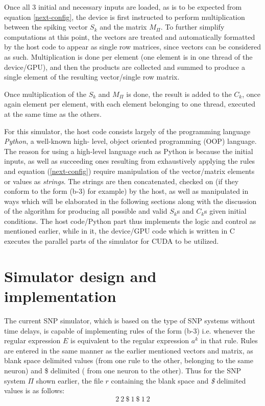 \documentclass{svmultm}
\begin{document}
Once all 3 initial and necessary inputs are loaded, as is to be
expected from equation \ref{next-config}, the device is first instructed to
perform multiplication between the spiking vector $S_k$ and the
matrix $M_{\Pi}$. To further simplify computations at this point, the
vectors are treated and automatically formatted by the host
code to appear as single row matrices, since vectors can be
considered as such. Multiplication is done per element (one
element is in one thread of the device/GPU{}), and then the
products are collected and summed to produce a single
element of the resulting vector/single row matrix.

Once multiplication of the $S_k$ and $M_{\Pi}$ is done,
the result is added to the $C_k$, once
again element per element, with each element belonging to
one thread, executed at the same time as the others.

For this simulator, the host code consists largely of
the programming language \textit{Python}, a well-known high-
level, object oriented programming (OOP) language. The
reason for using a high-level language such as Python is
because the initial inputs, as well as succeeding ones
resulting from exhaustively applying the rules and equation
(\ref{next-config}) require manipulation of the vector/matrix elements or
values as \textit{strings}. The strings are then concatenated, checked on (if they
conform to the form (b-3) for example) by the host, as well
as manipulated in ways which will be elaborated in the
following sections along with the discussion of the
algorithm for producing all possible and valid $S_k$s and $C_k$s given initial conditions. The host code/Python part thus implements the logic and control as mentioned earlier, while in it, the device/GPU code which is written in C executes the parallel parts of the simulator for CUDA to be utilized.


\section{Simulator design and implementation}\label{sect-snp-algo}

The current SNP simulator, which is based on the type of
SNP systems without time delays, is capable of
implementing rules of the form (b-3) i.e. whenever the
regular expression $E$ is equivalent to the regular expression $a^k$ in that rule. Rules are entered in the same manner
as the earlier mentioned vectors and matrix, as blank space
delimited values (from one rule to the other, belonging to the same neuron) and \$ delimited ( from one neuron to the
other). Thus for the SNP system ${\Pi}$ shown earlier, the file $r$
containing the blank space and \textit{\$} delimited values is as
follows:
\begin{equation}\label{rules}
2~2~\$~1~\$~1~2
\end{equation}
\end{document}
